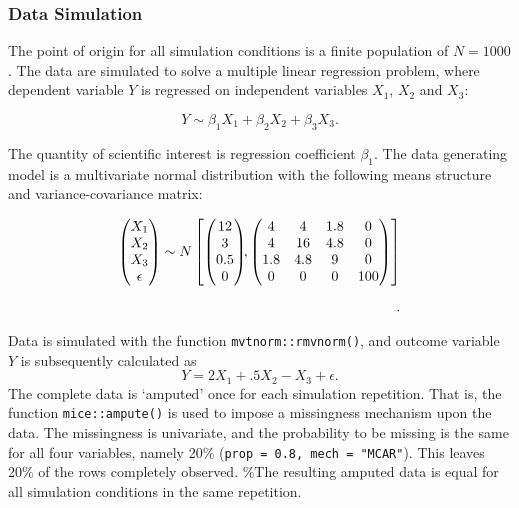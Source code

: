 \documentclass[
  Royal, times, sageapa]{sagej}
\begin{document}
\hypertarget{data-simulation}{%
\subsubsection{Data Simulation}\label{data-simulation}}

The point of origin for all simulation conditions is a finite population
of \(N=1000\). The data are simulated to solve a multiple linear
regression problem, where dependent variable \(Y\) is regressed on
independent variables \(X_1\), \(X_2\) and \(X_3\):

\[Y \sim \beta_1 X_1 + \beta_2 X_2 + \beta_3 X_3.\]

The quantity of scientific interest is regression coefficient
\(\beta_1\). The data generating model is a multivariate normal
distribution with the following means structure and variance-covariance
matrix:

\begin{align*}
\begin{pmatrix}X_1\\
X_2\\
X_3\\
\epsilon
\end{pmatrix} \sim  N
\begin{bmatrix}
\begin{pmatrix}
12\\
3\\
0.5\\
0
\end{pmatrix}\!\!,
\begin{pmatrix}
4 & 4 & 1.8 & 0\\
4 & 16 & 4.8 & 0\\
1.8 & 4.8 & 9 & 0\\
0 & 0 & 0 & 100
\end{pmatrix}
\end{bmatrix}\\[2\jot].
\end{align*}

Data is simulated with the function \texttt{mvtnorm::rmvnorm()}, and
outcome variable \(Y\) is subsequently calculated as
\[Y =  2X_1 + .5X_2 - X_3 + \epsilon .\] The complete data is `amputed'
once for each simulation repetition. That is, the function
\texttt{mice::ampute()} is used to impose a missingness mechanism upon
the data. The missingness is univariate, and the probability to be
missing is the same for all four variables, namely 20\%
(\texttt{prop\ =\ 0.8,\ mech\ =\ "MCAR"}). This leaves 20\% of the rows
completely observed. \%The resulting amputed data is equal for all
simulation conditions in the same repetition.
\end{document}
